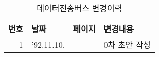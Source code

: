 %
\begin{table}[htbp]
\caption{데이터전송버스 변경이력}\label{table:dtb}
  \begin{center}
  \begin{tabular}{|r|l|l|l|} \hline
      번호 & 날짜 & 페이지 & 변경내용 \\ \hline \hline
      1  & '92.11.10. & & 0차 초안 작성 \\ \hline
  \end{tabular}
  \end{center}
\end{table}
%
